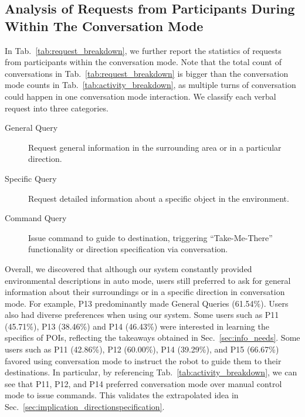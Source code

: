 


\subsection{Analysis of Requests from Participants During Within The Conversation Mode}
\label{sec:request_breakdown}
In Tab.~\ref{tab:request_breakdown}, we further report the statistics of requests from participants within the conversation mode. 
Note that the total count of conversations in Tab.~\ref{tab:request_breakdown} is bigger than the conversation mode counts in Tab.~\ref{tab:activity_breakdown}, as multiple turns of conversation could happen in one conversation mode interaction.
We classify each verbal request into three categories. 
\begin{description}
    \item[General Query] Request general information in the surrounding area or in a particular direction.
    \item[Specific Query] Request detailed information about a specific object in the environment.
    \item[Command Query] Issue command to guide to destination, triggering ``Take-Me-There'' functionality or direction specification via conversation.
\end{description}

Overall, we discovered that although our system constantly provided environmental descriptions in auto mode, users still preferred to ask for general information about their surroundings or in a specific direction in conversation mode. 
For example, P13 predominantly made General Queries (61.54\%). 
Users also had diverse preferences when using our system. 
Some users such as P11 (45.71\%), P13 (38.46\%) and P14 (46.43\%) were interested in learning the specifics of POIs, reflecting the takeaways obtained in Sec.~\ref{sec:info_needs}. 
Some users such as P11 (42.86\%), P12 (60.00\%), P14 (39.29\%), and P15 (66.67\%) favored using conversation mode to instruct the robot to guide them to their destinations. 
In particular, by referencing Tab.~\ref{tab:activity_breakdown}, we can see that P11, P12, and P14 preferred conversation mode over manual control mode to issue commands. 
This validates the extrapolated idea in Sec.~\ref{sec:implication_directionspecification}.

